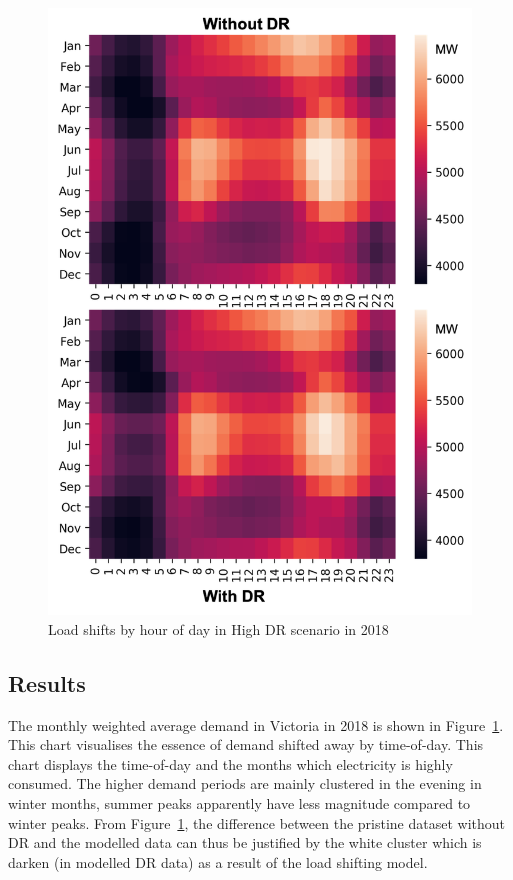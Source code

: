 \documentclass{pasa}%
\begin{document}
\begin{figure}
\begin{center}
\includegraphics[width=.85\textwidth,height=.51\textheight,keepaspectratio]{DR/PASA_example/Figures_DR/heatmap2018.png}
\caption{Load shifts by hour of day in High DR scenario in 2018}\label{fig:Fig-heatmap}
\end{center}
\end{figure}


\subsection{Results}
\label{sec:dis5.2}

The monthly weighted average demand in Victoria in 2018 is shown in Figure~\ref{fig:Fig-heatmap}. This chart visualises the essence of demand shifted away by time-of-day. This chart displays the time-of-day and the months which electricity is highly consumed. The higher demand periods are mainly clustered in the evening in winter months, summer peaks apparently have less magnitude compared to winter peaks.
From Figure~\ref{fig:Fig-heatmap}, the difference between the pristine dataset without DR and the modelled data can thus be justified by the white cluster which is darken (in modelled DR data) as a result of the load shifting model.
\end{document}

